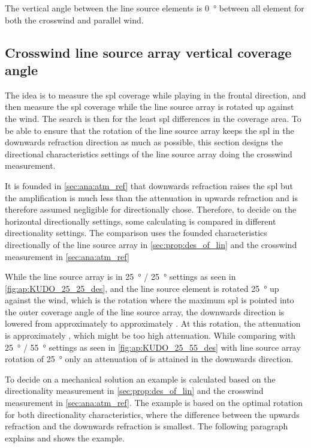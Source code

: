 
The vertical angle between the line source elements is \SI{0}{\degree} between all element for both the crosswind and parallel wind.  

\subsection{Crosswind line source array vertical coverage angle} \label{sub:des:cros_set}
The idea is to measure the \gls{spl} coverage while playing in the frontal direction, and then measure the \gls{spl} coverage while the line source array is rotated up against the wind. The search is then for the least \gls{spl} differences in the coverage area. To be able to ensure that the rotation of the line source array keeps the \gls{spl} in the downwards refraction direction as much as possible, this section designs the directional characteristics settings of the line source array doing the crosswind measurement.

It is founded in \autoref{sec:ana:atm_ref} that downwards refraction raises the \gls{spl} but the amplification is much less than the attenuation in upwards refraction and is therefore assumed negligible for directionally chose. Therefore, to decide on the horizontal directionally settings, some calculating is compared in different directionality settings. The comparison uses the founded characteristics directionally of the line source array in \autoref{sec:prop:des_of_lin} and the crosswind measurement in \autoref{sec:ana:atm_ref}


While the line source array is in \SI{25}{\degree} / \SI{25}{\degree} settings as seen in \autoref{fig:ap:KUDO_25_25_des}, and the line source element is rotated \SI{25}{\degree} up against the wind, which is the rotation where the maximum \gls{spl} is pointed into the outer  coverage angle of the line source array, the downwards direction is lowered from approximately  to approximately . At this rotation, the attenuation is approximately , which might be too high attenuation. While comparing with \SI{25}{\degree} / \SI{55}{\degree} settings as seen in \autoref{fig:ap:KUDO_25_55_des} with line source array rotation of \SI{25}{\degree} only an attenuation of  is attained in the downwards direction. 

To decide on a mechanical solution an example is calculated based on the directionality measurement in \autoref{sec:prop:des_of_lin} and the crosswind measurement in \autoref{sec:ana:atm_ref}. The example is based on the optimal rotation for both directionality characteristics, where the difference between the upwards refraction and the downwards refraction is smallest. The following paragraph explains and shows the example.


